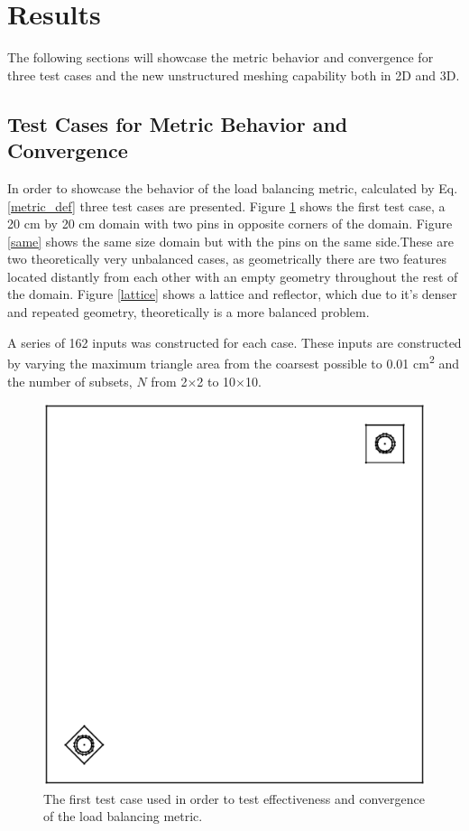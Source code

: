 \documentclass{anstrans}
\begin{document}
\section{Results}
\label{ch:results}
The following sections will showcase the metric behavior and convergence for three test cases and the new unstructured meshing capability both in 2D and 3D.

\subsection{Test Cases for Metric Behavior and Convergence}
\label{sec:convergence}
In order to showcase the behavior of the load balancing metric, calculated by Eq. \ref{metric_def} three test cases are presented. Figure \ref{opp} shows the first test case, a 20 cm by 20 cm domain with two pins in opposite corners of the domain. Figure \ref{same} shows the same size domain but with the pins on the same side.These are two theoretically very unbalanced cases, as geometrically there are two features located distantly from each other with an empty geometry throughout the rest of the domain. Figure \ref{lattice} shows a lattice and reflector, which due to it's denser and repeated geometry, theoretically is a more balanced problem. 

A series of 162 inputs was constructed for each case. These inputs are constructed by varying the maximum triangle area from the coarsest possible to 0.01 cm\textsuperscript{2} and the number of subsets, $N$ from 2$\times$2 to 10$\times$10. 

\begin{figure}[H]
\centering
\includegraphics[scale = 0.5]{figures/unbalanced_lattice.eps}
\caption{The first test case used in order to test effectiveness and convergence of the load balancing metric.}
\label{opp}
\end{figure}
\end{document}
